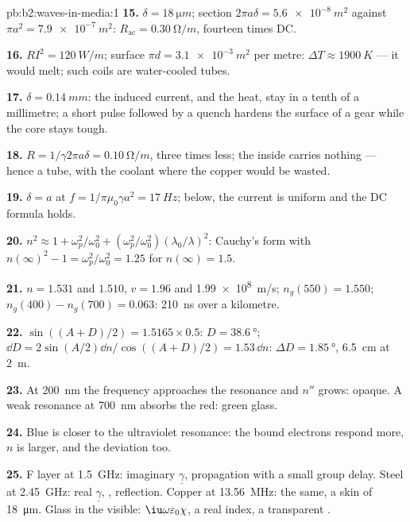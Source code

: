 \begin{solution}{pb:b2:waves-in-media:1}
\textbf{15.} $\delta = \qty{18}{\micro m}$; section $2\pi a\delta = \qty{5.6e-8}{m^2}$ against
$\pi a^2 = \qty{7.9e-7}{m^2}$: $R_{\text{ac}} = \qty{0.30}{\ohm/m}$, fourteen times DC.

\textbf{16.} $RI^2 = \qty{120}{W/m}$; surface $\pi d = \qty{3.1e-3}{m^2}$ per metre:
$\Delta T \approx \qty{1900}{K}$ --- it would melt; such coils are water-cooled tubes.

\textbf{17.} $\delta = \qty{0.14}{mm}$: the induced current, and the heat, stay
in a tenth of a millimetre; a short pulse followed by a quench hardens
the surface of a gear while the core stays tough.

\textbf{18.} $R = 1/\gamma2\pi a\delta = \qty{0.10}{\ohm/m}$, three times less; the
inside carries nothing --- hence a tube, with the coolant where the
copper would be wasted.

\textbf{19.} $\delta = a$ at $f = 1/\pi\mu_0\gamma a^2 = \qty{17}{Hz}$; below, the current is
uniform and the DC formula holds.

\textbf{20.} $n^2 \approx 1 + \omega_p^2/\omega_0^2 + (\omega_p^2/\omega_0^2)(\lambda_0/\lambda)^2$: Cauchy's form
with $n(\infty)^2 - 1 = \omega_p^2/\omega_0^2 = 1.25$ for $n(\infty) = 1.5$.

\textbf{21.} $n = 1.531$ and $1.510$, $v = 1.96$ and \qty{1.99e8}{m/s}; $n_g(550) =
1.550$; $n_g(400) - n_g(700) = 0.063$: \qty{210}{ns} over a kilometre.

\textbf{22.} $\sin((A + D)/2) = 1.5165 \times 0.5$: $D = \qty{38.6}{\degree}$; $\dd D = 2\sin
(A/2)\dd n/\cos((A + D)/2) = 1.53\,\dd n$: $\Delta D = \qty{1.85}{\degree}$, \qty{6.5}{cm} at \qty{2}{m}.

\textbf{23.} At \qty{200}{nm} the frequency approaches the resonance and
$n''$ grows: opaque. A weak resonance at \qty{700}{nm} absorbs the red:
green glass.

\textbf{24.} Blue is closer to the ultraviolet resonance: the bound
electrons respond more, $n$ is larger, and the deviation too.

\textbf{25.} F layer at \qty{1.5}{GHz}: imaginary $\underline\gamma$, propagation
with a small group delay. Steel at \qty{2.45}{GHz}: real $\underline\gamma$, , reflection. Copper at \qty{13.56}{MHz}: the same, a skin of
\qty{18}{\micro m}. Glass in the visible: $\iu\omega\varepsilon_0\chi$, a real index, a
transparent .
\end{solution}
